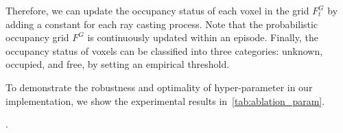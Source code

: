     Therefore, we can update the occupancy status of each voxel in the grid $F^G_t$ by adding a constant for each ray casting process. Note that the probabilistic occupancy grid $F^G$ is continuously updated within an episode. Finally, the occupancy status of voxels can be classified into three categories: unknown, occupied, and free, by setting an empirical threshold.
    
    To demonstrate the robustness and optimality of hyper-parameter in our implementation, we show the experimental results in~\cref{tab:ablation_param}.

    \begin{table}[ht!]
        \center
        \setlength{\tabcolsep}{8pt}    %
        \renewcommand{\arraystretch}{1.5}   %
        \caption{Evaluation results for different empirical parameters in the implementation of occupancy grid mapping algorithm. Note that we use a constant $C'$ to represent the value of a ratio $|\frac{C_1}{C_2}|$ introduced in \ref{app:grid}}.
        \label{tab:ablation_param}
    \end{table}


